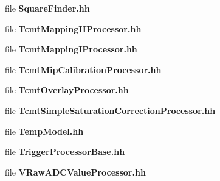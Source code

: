 \begin{DoxyCompactItemize}
\item 
file {\bfseries SquareFinder.hh}
\item 
file {\bfseries TcmtMappingIIProcessor.hh}
\item 
file {\bfseries TcmtMappingIProcessor.hh}
\item 
file {\bfseries TcmtMipCalibrationProcessor.hh}
\item 
file {\bfseries TcmtOverlayProcessor.hh}
\item 
file {\bfseries TcmtSimpleSaturationCorrectionProcessor.hh}
\item 
file {\bfseries TempModel.hh}
\item 
file {\bfseries TriggerProcessorBase.hh}
\item 
file {\bfseries VRawADCValueProcessor.hh}
\end{DoxyCompactItemize}
